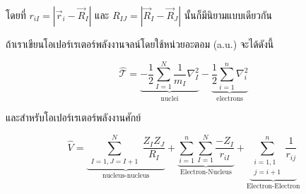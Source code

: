 \noindent โดยที่ $r_{iI} = |\vec{r}_i - \vec{R}_I|$ และ $R_{IJ} = |\vec{R}_I - \vec{R}_J|$ นั้นก็มีนิยามแบบเดียวกัน



ถ้าเราเขียนโอเปอร์เรเตอร์พลังงานจลน์โดยใช้หน่วยอะตอม (a.u.) จะได้ดังนี้

\begin{equation}
    \label{eq:kinetic_operator_au}
    \hat{\mathscr{T}}
    =
    \underbrace
    {
        - \frac{1}{2} \sum_{I=1}^N \frac{1}{m_I} \nabla_I^2
    }_
    {
        \text{nuclei}
    }
    - \underbrace
    {
        \frac{1}{2} \sum_{i=1}^n \nabla_i^2
    }_
    {
        \text{electrons}
    }
\end{equation}

\noindent และสำหรับโอเปอร์เรเตอร์พลังงานศักย์

\begin{equation}
    \label{eq:potential_operator_au}
    \hat{V}
    = \underbrace
    {
        \sum_{\substack{I=1, J=I+1}}^N \frac{Z_I Z_J}{R_I}
    }_
    {
        \text{nucleus-nucleus}
    }
    + \underbrace
    {
        \sum_{i=1}^n \sum_{I=1}^N \frac{-Z_I}{r_{i I}}
    }_
    {
        \text{Electron-Nucleus}
    }
    + \underbrace
    {
        \sum_{\substack{i=1,1 \\ j=i+1}}^n \frac{1}{r_{i j}}
    }_
    {
        \text{Electron-Electron}
    }
\end{equation}

